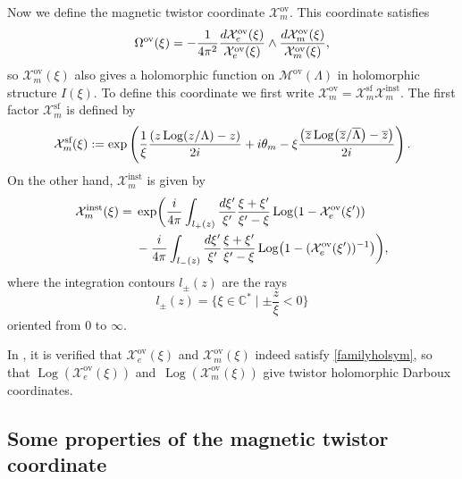 \documentclass[11pt]{article}
\numberwithin{equation}{section}
\numberwithin{equation}{section}
\begin{document}
Now we define the magnetic twistor coordinate $\mathcal{X}_m^\text{ov}$. This coordinate satisfies
\begin{equation}\label{familyholsym}
 \Omega^{\text{ov}}(\xi)=-\frac{1}{4\pi^2}\frac{{\rm d}\mathcal{X}_e^\text{ov}(\xi)}{\mathcal{X}_e^\text{ov}(\xi)}\wedge \frac{{\rm d}\mathcal{X}_m^\text{ov}(\xi)}{\mathcal{X}_m^\text{ov}(\xi)},
\end{equation}
so $\mathcal{X}_m^\text{ov}(\xi)$ also gives a holomorphic function on $\mathcal{M}^{\text{ov}}(\Lambda)$ in holomorphic structure $I(\xi)$. To define this coordinate we first write $\mathcal{X}_m^\text{ov}=\mathcal{X}_m^{\text{sf}}\mathcal{X}_m^{\text{inst}}$. The first factor $\mathcal{X}_m^{\text{sf}}$ is defined by
\begin{equation}\label{Xmsf}
 \mathcal{X}_m^{\text{sf}}(\xi):=\exp \left(\frac{1}{\xi}\frac{(z\operatorname{Log}(z/\Lambda)-z)}{2 {\rm i}}+{\rm i}\theta_m -\xi\frac{\bigl(\overline{z} \operatorname{Log}\bigl(\overline{z}/\overline{\Lambda}\bigr)-\overline{z}\bigr)}{2 {\rm i}}\right).
\end{equation}
On the other hand, $\mathcal{X}_m^{\text{inst}}$ is given by
\begin{align}
 \mathcal{X}_m^{\text{inst}}(\xi)={}&\exp \biggl(\frac{{\rm i}}{4\pi}\int_{l_{+}(z)}\frac{{\rm d}\xi'}{\xi'}\frac{\xi+\xi'}{\xi'-\xi}\operatorname{Log}(1-\mathcal{X}_e^\text{ov}(\xi'))\nonumber\\
 &- \frac{{\rm i}}{4\pi}\int_{l_{-}(z)}\frac{{\rm d}\xi'}{\xi'}\frac{\xi+\xi'}{\xi'-\xi}\operatorname{Log}\bigl(1-(\mathcal{X}_e^\text{ov}(\xi'))^{-1}\bigr)\biggr),\label{Xminst}
\end{align}
where the integration contours $l_{\pm}(z)$ are the rays
\begin{equation}\label{rays}
 l_{\pm}(z)=\biggl\{\xi \in \mathbb{C}^* \mid \pm\frac{z}{\xi}<0\biggr\}
\end{equation}
oriented from $0$ to $\infty$.

In \cite{GMN1}, it is verified that $\mathcal{X}_e^\text{ov}(\xi)$ and $\mathcal{X}_m^\text{ov}(\xi)$ indeed satisfy \eqref{familyholsym}, so that $\operatorname{Log}(\mathcal{X}_e^\text{ov}(\xi))$ and~$\operatorname{Log}(\mathcal{X}_m^\text{ov}(\xi))$ give twistor holomorphic Darboux coordinates.

\subsection{Some properties of the magnetic twistor coordinate}
\end{document}
